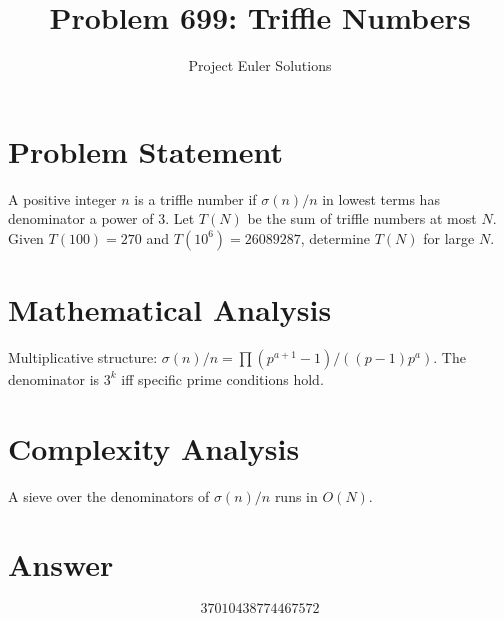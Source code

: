 \documentclass[11pt]{article}
\title{Problem 699: Triffle Numbers}
\author{Project Euler Solutions}
\date{}
\begin{document}
\maketitle

\section{Problem Statement}

A positive integer $n$ is a triffle number if $\sigma(n)/n$ in lowest terms has denominator a power of 3. Let $T(N)$ be the sum of triffle numbers at most $N$. Given $T(100)=270$ and $T(10^6)=26089287$, determine $T(N)$ for large $N$.

\section{Mathematical Analysis}

Multiplicative structure: $\sigma(n)/n = \prod (p^{a+1}-1)/((p-1)p^a)$. The denominator is $3^k$ iff specific prime conditions hold.

\section{Complexity Analysis}

A sieve over the denominators of $\sigma(n)/n$ runs in $O(N)$.

\section{Answer}

\[
\boxed{37010438774467572}
\]
\end{document}
